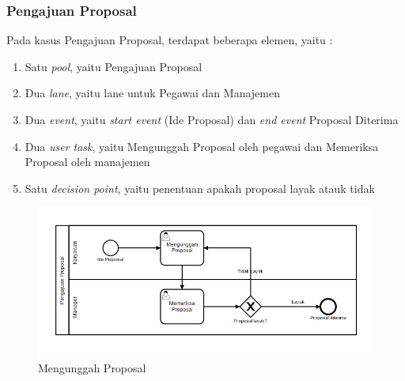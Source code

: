 \subsubsection{Pengajuan Proposal}
Pada kasus Pengajuan Proposal, terdapat beberapa elemen, yaitu :
\begin{enumerate}
	\item Satu \textit{pool}, yaitu Pengajuan Proposal
	\item Dua \textit{lane}, yaitu lane untuk Pegawai dan Manajemen
	\item Dua \textit{event}, yaitu \textit{start event} (Ide Proposal) dan \textit{end event} Proposal Diterima
	\item Dua \textit{user task}, yaitu Mengunggah Proposal oleh pegawai dan Memeriksa Proposal oleh manajemen
	\item Satu \textit{decision point}, yaitu penentuan apakah proposal layak atauk tidak
\end{enumerate}

	\begin{figure}[H]
			\centering
			\includegraphics[scale=0.5]{Gambar/Bab-3/Kasus2-3}
			\caption{Mengunggah Proposal} 
			\label{fig:pengajuanproposal_mengunggahproposal}
	\end{figure}
	
